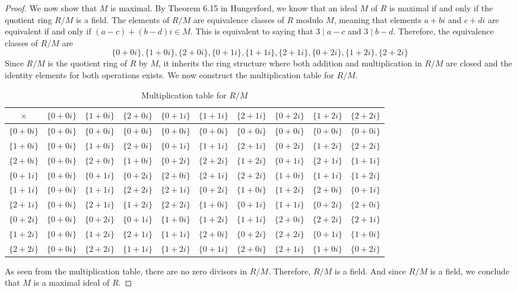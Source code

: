 \documentclass{article}
\theoremstyle{plain} %
\theoremstyle{definition} %
\begin{document}
\begin{proof}
    We now show that $M$ is maximal.
    By Theorem 6.15 in Hungerford, we know that an ideal $M$ of $R$ is maximal if and only if the quotient ring $R/M$ is a field. 
    The elements of $R/M$ are equivalence classes of $R$ modulo $M$, meaning that elements $a+bi$ and $c+di$ are equivalent if and only if 
    $(a-c) + (b-d)i \in M$.
    This is equivalent to saying that $3 \mid a-c$ and $3 \mid b-d$.
    Therefore, the equivalence classes of $R/M$ are 
    \[
        \{0+0i\}, \{1+0i\}, \{2+0i\}, \{0+1i\}, \{1+1i\}, \{2+1i\}, \{0+2i\}, \{1+2i\}, \{2+2i\}
    \]
    Since $R/M$ is the quotient ring of $R$ by $M$, it inherits the ring structure where both addition and multiplication in $R/M$ are closed
    and the identity elements for both operations exists. 
    We now construct the multiplication table for $R/M$.
    \begin{table}[H]
        \centering
        \begin{tabular}{c|c|c|c|c|c|c|c|c|c|}
            $\times$ & $\{0+0i\}$ & $\{1+0i\}$ & $\{2+0i\}$ & $\{0+1i\}$ & $\{1+1i\}$ & $\{2+1i\}$ & $\{0+2i\}$ & $\{1+2i\}$ & $\{2+2i\}$ \\
            \hline
            $\{0+0i\}$ & $\{0+0i\}$ & $\{0+0i\}$ & $\{0+0i\}$ & $\{0+0i\}$ & $\{0+0i\}$ & $\{0+0i\}$ & $\{0+0i\}$ & $\{0+0i\}$ & $\{0+0i\}$ \\
            $\{1+0i\}$ & $\{0+0i\}$ & $\{1+0i\}$ & $\{2+0i\}$ & $\{0+1i\}$ & $\{1+1i\}$ & $\{2+1i\}$ & $\{0+2i\}$ & $\{1+2i\}$ & $\{2+2i\}$ \\
            $\{2+0i\}$ & $\{0+0i\}$ & $\{2+0i\}$ & $\{1+0i\}$ & $\{0+2i\}$ & $\{2+2i\}$ & $\{1+2i\}$ & $\{0+1i\}$ & $\{2+1i\}$ & $\{1+1i\}$ \\
            $\{0+1i\}$ & $\{0+0i\}$ & $\{0+1i\}$ & $\{0+2i\}$ & $\{2+0i\}$ & $\{2+1i\}$ & $\{2+2i\}$ & $\{1+0i\}$ & $\{1+1i\}$ & $\{1+2i\}$ \\
            $\{1+1i\}$ & $\{0+0i\}$ & $\{1+1i\}$ & $\{2+2i\}$ & $\{2+1i\}$ & $\{0+2i\}$ & $\{1+0i\}$ & $\{1+2i\}$ & $\{2+0i\}$ & $\{0+1i\}$ \\
            $\{2+1i\}$ & $\{0+0i\}$ & $\{2+1i\}$ & $\{1+2i\}$ & $\{2+2i\}$ & $\{1+0i\}$ & $\{0+1i\}$ & $\{1+1i\}$ & $\{0+2i\}$ & $\{2+0i\}$ \\
            $\{0+2i\}$ & $\{0+0i\}$ & $\{0+2i\}$ & $\{0+1i\}$ & $\{1+0i\}$ & $\{1+2i\}$ & $\{1+1i\}$ & $\{2+0i\}$ & $\{2+2i\}$ & $\{2+1i\}$ \\
            $\{1+2i\}$ & $\{0+0i\}$ & $\{1+2i\}$ & $\{2+1i\}$ & $\{1+1i\}$ & $\{2+0i\}$ & $\{0+2i\}$ & $\{2+2i\}$ & $\{0+1i\}$ & $\{1+0i\}$ \\
            $\{2+2i\}$ & $\{0+0i\}$ & $\{2+2i\}$ & $\{1+1i\}$ & $\{1+2i\}$ & $\{0+1i\}$ & $\{2+0i\}$ & $\{2+1i\}$ & $\{1+0i\}$ & $\{0+2i\}$ \\
        \end{tabular}
        \caption{Multiplication table for $R/M$}
    \end{table}

    As seen from the multiplication table, there are no zero divisors in $R/M$.
    Therefore, $R/M$ is a field.
    And since $R/M$ is a field, we conclude that $M$ is a maximal ideal of $R$.
\end{proof}
\end{document}
